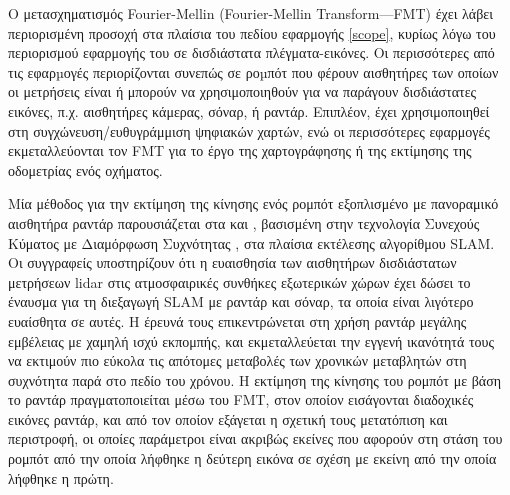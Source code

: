 Ο μετασχηματισμός Fourier-Mellin (Fourier-Mellin Transform---FMT) έχει λάβει
περιορισμένη προσοχή στα πλαίσια του πεδίου εφαρμογής \ref{scope}, κυρίως λόγω
του περιορισμού εφαρμογής του σε δισδιάστατα πλέγματα-εικόνες. Οι περισσότερες
από τις εφαρµογές περιορίζονται συνεπώς σε ροµπότ που φέρουν αισθητήρες των
οποίων οι μετρήσεις είναι ή μπορούν να χρησιμοποιηθούν για να παράγουν
δισδιάστατες εικόνες, π.χ. αισθητήρες κάμερας, σόναρ, ή ραντάρ.  Επιπλέον, έχει
χρησιμοποιηθεί στη συγχώνευση/ευθυγράμμιση ψηφιακών χαρτών, ενώ οι περισσότερες
εφαρμογές εκμεταλλεύονται τον FMT για το έργο της χαρτογράφησης ή της εκτίμησης
της οδομετρίας ενός οχήματος.

Μία μέθοδος για την εκτίμηση της κίνησης ενός ρομπότ εξοπλισμένο με πανοραμικό
αισθητήρα ραντάρ παρουσιάζεται στα \cite{Checchin2010} και \cite{Vivet2013},
βασισμένη στην τεχνολογία Συνεχούς Κύματος με Διαμόρφωση Συχνότητας
\cite{Monod1995}, στα πλαίσια εκτέλεσης αλγορίθμου SLAM. Οι συγγραφείς
υποστηρίζουν ότι η ευαισθησία των αισθητήρων δισδιάστατων μετρήσεων lidar στις
ατμοσφαιρικές συνθήκες εξωτερικών χώρων έχει δώσει το έναυσμα για τη διεξαγωγή
SLAM με ραντάρ και σόναρ, τα οποία είναι λιγότερο ευαίσθητα σε αυτές. Η έρευνά
τους επικεντρώνεται στη χρήση ραντάρ μεγάλης εμβέλειας με χαμηλή ισχύ εκπομπής,
και εκμεταλλεύεται την εγγενή ικανότητά τους να εκτιμούν πιο εύκολα τις απότομες
μεταβολές των χρονικών μεταβλητών στη συχνότητα παρά στο πεδίο του χρόνου. Η
εκτίμηση της κίνησης του ρομπότ με βάση το ραντάρ πραγματοποιείται μέσω του
FMT, στον οποίον εισάγονται διαδοχικές εικόνες ραντάρ, και από τον οποίον
εξάγεται η σχετική τους μετατόπιση και περιστροφή, οι οποίες παράμετροι είναι
ακριβώς εκείνες που αφορούν στη στάση του ρομπότ από την οποία λήφθηκε η
δεύτερη εικόνα σε σχέση με εκείνη από την οποία λήφθηκε η πρώτη.

